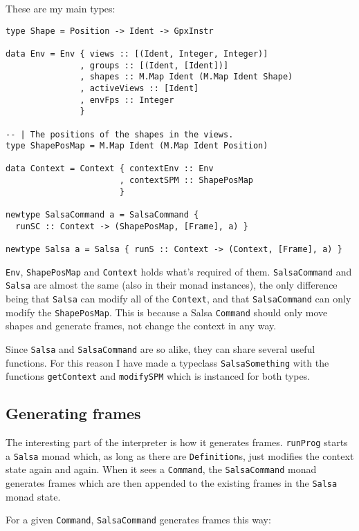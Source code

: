 \documentclass[10pt,a4paper]{article}
\begin{document}
These are my main types:
\begin{verbatim}
type Shape = Position -> Ident -> GpxInstr

data Env = Env { views :: [(Ident, Integer, Integer)]
               , groups :: [(Ident, [Ident])]
               , shapes :: M.Map Ident (M.Map Ident Shape)
               , activeViews :: [Ident]
               , envFps :: Integer
               }

-- | The positions of the shapes in the views.
type ShapePosMap = M.Map Ident (M.Map Ident Position)

data Context = Context { contextEnv :: Env
                       , contextSPM :: ShapePosMap
                       }

newtype SalsaCommand a = SalsaCommand {
  runSC :: Context -> (ShapePosMap, [Frame], a) }

newtype Salsa a = Salsa { runS :: Context -> (Context, [Frame], a) }
\end{verbatim}

\verb+Env+, \verb+ShapePosMap+ and \verb+Context+ holds what's required of them.
\verb+SalsaCommand+ and \verb+Salsa+ are almost the same (also in their monad
instances), the only difference being that \verb+Salsa+ can modify all of the
\verb+Context+, and that \verb+SalsaCommand+ can only modify the
\verb+ShapePosMap+.  This is because a Salsa \verb+Command+ should only move
shapes and generate frames, not change the context in any way.

Since \verb+Salsa+ and \verb+SalsaCommand+ are so alike, they can share several
useful functions.  For this reason I have made a typeclass \verb+SalsaSomething+
with the functions \verb+getContext+ and \verb+modifySPM+ which is instanced
for both types.


\subsection{Generating frames}

The interesting part of the interpreter is how it generates frames.
\verb+runProg+ starts a \verb+Salsa+ monad which, as long as there are
\verb+Definition+s, just modifies the context state again and again.  When it
sees a \verb+Command+, the \verb+SalsaCommand+ monad generates frames which are
then appended to the existing frames in the \verb+Salsa+ monad state.

For a given \verb+Command+, \verb+SalsaCommand+ generates frames this way:
\end{document}
